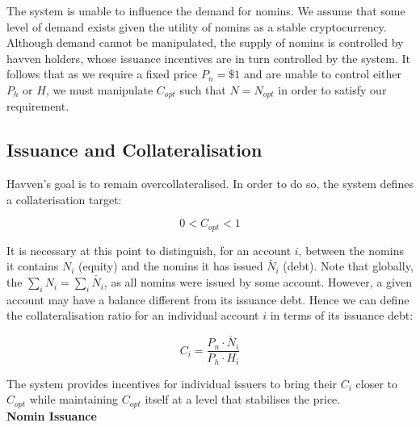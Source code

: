 \noindent The system is unable to influence the demand for nomins. We assume that some level of demand exists given the utility of nomins as a stable cryptocurrency. Although demand cannot be manipulated, the supply of nomins is controlled by havven holders, whose issuance incentives are in turn controlled by the system. It follows that as we require a fixed price $P_n = \$1 $ and are unable to control either $P_h$ or $H$, we must manipulate $C_{opt}$ such that $N = N_{opt}$ in order to satisfy our requirement.

\subsection{Issuance and Collateralisation} 


\noindent Havven's goal is to remain overcollateralised. In order to do so, the system defines a collaterisation target:

\begin{equation}
0 < C_{opt} < 1  \label{eq:target}
\end{equation}

\vspace{2 mm}

\noindent It is necessary at this point to distinguish, for an account $i$, between the nomins it contains $N_i$ (equity) and the nomins it has issued $\check{N_i}$ (debt). Note that globally, the $\sum_{i}N_i = \sum_{i}\check{N_i}$, as all nomins were issued by some account. However, a given account may have a balance different from its issuance debt. Hence we can define the collateralisation ratio for an individual account $i$ in terms of its issuance debt:


\begin{equation}
C_i = \frac{P_n \cdot \check{N_i}}{P_h \cdot H_i}  \label{eq:individualcollateralisation}
\end{equation}

\vspace{2 mm}

\noindent The system provides incentives for individual issuers to bring their $C_i$ closer to $C_{opt}$ while maintaining $C_{opt}$ itself at a level that stabilises the price. \\

\noindent \textbf{Nomin Issuance} \\

